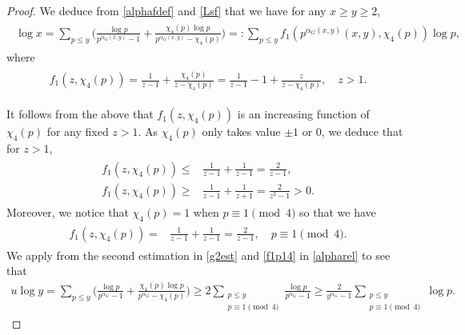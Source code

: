 \documentclass[twoside,leqno,10pt, A4]{amsart}
\begin{document}
\begin{proof}
  We deduce from \eqref{alphafdef} and \eqref{Lsf} that we have for any $x \geq y \geq 2$, 
\begin{align}
\label{alpharel}
\begin{split}
 \log x =\sum_{p \leq y} \Big(\frac {\log p}{p^{\alpha_G (x,y)}-1}+\frac {\chi_4(p)\log p}{p^{\alpha_G  (x,y)}-\chi_4(p)}\Big) =:\sum_{p \leq y} f_1(p^{\alpha_G  (x,y)}  (x,y), \chi_4(p))\log p, 
\end{split}
\end{align}     
  where 
\begin{align*}
\begin{split}
 f_1(z, \chi_4(p))=\frac {1}{z-1}+\frac {\chi_4(p)}{z-\chi_4(p)}=\frac {1}{z-1}-1+\frac {z}{z-\chi_4(p)}, \quad z>1.
\end{split}
\end{align*}   
  
  It follows from the above that $f_1(z, \chi_4(p))$ is an increasing function of $\chi_4(p)$ for any fixed $z > 1$.  As $\chi_4(p)$ only takes value $\pm 1$ or $0$, we deduce that for $z>1$, 
\begin{align}
\label{g2est}
\begin{split}
 f_1(z, \chi_4(p)) \leq & \frac {1}{z-1}+\frac {1}{z-1}= \frac 2{z-1}, \\
 f_1(z, \chi_4(p)) \geq &  \frac {1}{z-1}+\frac {1}{z+1}=\frac {2}{z^2-1}>0.
\end{split}
\end{align} 
  Moreover, we notice that $\chi_4(p)=1$ when $p \equiv 1 \pmod 4$ so that we have
\begin{align}
\label{f1p14}
\begin{split}
 f_1(z, \chi_4(p)) = & \frac {1}{z-1}+\frac {1}{z-1}= \frac 2{z-1}, \quad  p \equiv 1 \pmod 4.
\end{split}
\end{align}   
  We apply from the second estimation in \eqref{g2est} and \eqref{f1p14} in \eqref{alpharel} to see that  
\begin{align}
\label{ulogylower}
u\log y=\sum_{p \leq y}\Big(\frac {\log p}{p^{\alpha_G}-1}+\frac {\chi_4(p)\log p}{p^{\alpha_G}-\chi_4(p)}\Big ) \geq 2\sum_{\substack{p \leq y \\ p \equiv 1 \pmod 4}} \frac {\log p}{p^{\alpha_G}-1} \geq \frac {2}{y^{\alpha_G}-1}\sum_{\substack{p \leq y \\ p \equiv 1 \pmod 4}} \log p .
\end{align}  
   

\end{proof}
\end{document}
